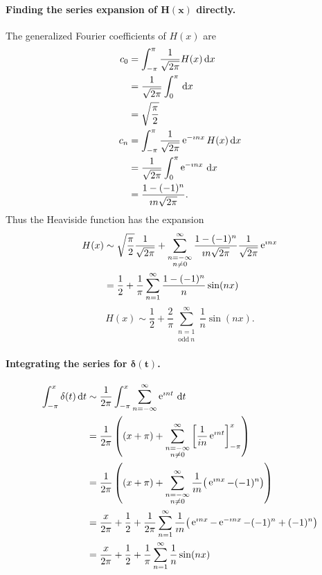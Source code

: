 \begin{Example}
  \paragraph{Finding the series expansion of $\mathbf{H(x)}$ directly.}
  The generalized Fourier coefficients of $H(x)$ are
  \begin{align*}
    c_0     &= \int_{-\pi}^\pi \frac{1}{\sqrt{2\pi}} H(x)\,\mathrm{d} x \\
    &= \frac{1}{\sqrt{2\pi}} \int_0^\pi \,\mathrm{d} x \\
    &= \sqrt{\frac{\pi}{2}} \\
    c_n     &= \int_{-\pi}^\pi \frac{1}{\sqrt{2\pi}} \mathop{\mathrm{e}}\nolimits^{-\imath n x} H(x)\,\mathrm{d} x \\
    &= \frac{1}{\sqrt{2\pi}} \int_0^\pi \mathop{\mathrm{e}}\nolimits^{-\imath n x} \,\mathrm{d} x \\
    &= \frac{1 - (-1)^n}{\imath n \sqrt{2\pi}}.
  \end{align*}
  Thus the Heaviside function has the expansion
  \begin{align*}
    H(x)    &\sim \sqrt{\frac{\pi}{2}} \frac{1}{\sqrt{2\pi}}
    + \sum_{\substack{ n = -\infty \\ n \neq 0 }}^\infty
    \frac{1 - (-1)^n}{\imath n \sqrt{2\pi}}
    \frac{1}{\sqrt{2\pi}} \mathop{\mathrm{e}}\nolimits^{\imath n x} \\
    &= \frac{1}{2} + \frac{1}{\pi} \sum_{n = 1}^\infty \frac{1 - (-1)^n}{n}
    \sin(n x)
  \end{align*}
  \[ \boxed{H(x) \sim \frac{1}{2} + \frac{2}{\pi} \sum_{\substack{ {n} = 1 \\ \mathrm{odd}\ n}}^{\infty} 
    \frac{1}{n} \sin(n x).} \]





  \paragraph{Integrating the series for $\mathbf{\boldsymbol{\delta}(t)}$.}
  \begin{align*}
    \int_{-\pi}^x \delta(t)\,\mathrm{d} t
    &\sim \frac{1}{2\pi} \int_{-\pi}^x \sum_{n = -\infty}^\infty \mathop{\mathrm{e}}\nolimits^{\imath n t} \,\mathrm{d} t \\
    &= \frac{1}{2\pi} \left( (x+\pi) + 
      \sum_{\substack{ n=-\infty \\ n \neq 0 }}^\infty
      \left[ \frac{1}{in}\mathop{\mathrm{e}}\nolimits^{\imath n t} \right]_{-\pi}^x \right) \\
    &= \frac{1}{2\pi} \left( (x+\pi) + 
      \sum_{\substack{ n=-\infty \\ n \neq 0 }}^\infty
      \frac{1}{\imath n} \big(\mathop{\mathrm{e}}\nolimits^{\imath n x} - (-1)^n\big) \right) \\
    &= \frac{x}{2\pi} + \frac{1}{2} + \frac{1}{2\pi}
    \sum_{n = 1}^\infty \frac{1}{\imath n} \big(\mathop{\mathrm{e}}\nolimits^{\imath n x} - \mathop{\mathrm{e}}\nolimits^{-\imath n x} 
    -(-1)^n + (-1)^n\big) \\
    &= \frac{x}{2\pi} + \frac{1}{2} + \frac{1}{\pi}
    \sum_{n = 1}^\infty \frac{1}{n} \sin(n x) 
  \end{align*}


\end{Example}
